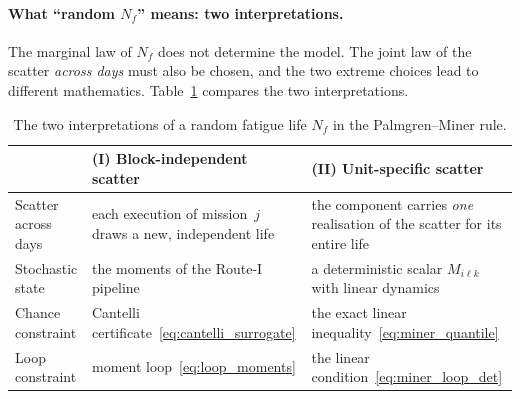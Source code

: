 \documentclass[11pt,a4paper]{article}
\theoremstyle{plain}
\theoremstyle{definition}
\theoremstyle{remark}
\begin{document}
\paragraph{What ``random $N_f$'' means: two interpretations.}
The marginal law of $N_f$ does not determine the model.
The joint law of the scatter \emph{across days} must also be chosen, and the two extreme choices lead to different mathematics.
Table~\ref{tab:miner_interpretations} compares the two interpretations.

\begin{table}[htbp]
\centering
\caption{The two interpretations of a random fatigue life $N_f$ in the Palmgren--Miner rule.}
\label{tab:miner_interpretations}
\small
\begin{tabularx}{\linewidth}{@{}>{\hsize=0.600\hsize\raggedright\arraybackslash}X>{\hsize=1.200\hsize\raggedright\arraybackslash}X>{\hsize=1.200\hsize\raggedright\arraybackslash}X@{}}
\toprule
\rowcolor{headgrey}
 & \textbf{(I) Block-independent scatter} & \textbf{(II) Unit-specific scatter} \\
\midrule
Scatter across days & each execution of mission~$j$ draws a new, independent life & the component carries \emph{one} realisation of the scatter for its entire life \\
Stochastic state & the moments of the Route-I pipeline & a deterministic scalar $M_{i\ell k}$ with linear dynamics \\
Chance constraint & Cantelli certificate~\eqref{eq:cantelli_surrogate} & the exact linear inequality~\eqref{eq:miner_quantile} \\
Loop constraint & moment loop~\eqref{eq:loop_moments} & the linear condition~\eqref{eq:miner_loop_det} \\
\bottomrule
\end{tabularx}
\end{table}
\end{document}
